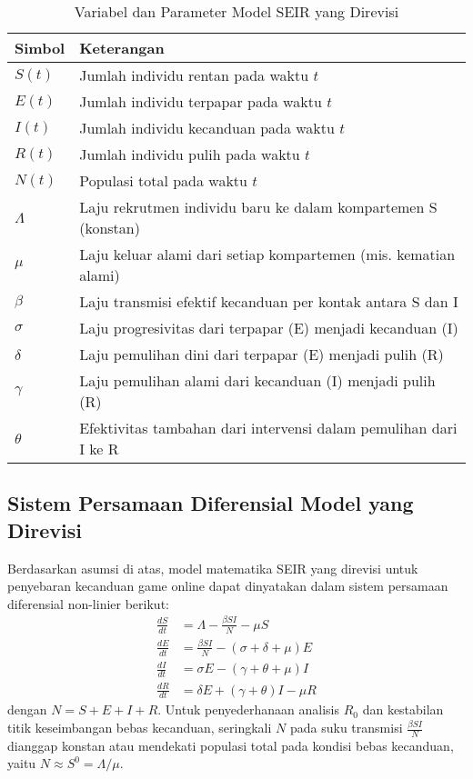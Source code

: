 \documentclass[12pt,a4paper]{article}
\begin{document}
\begin{table}[h!]
\centering
\caption{Variabel dan Parameter Model SEIR yang Direvisi}
\begin{tabular}{ll}
\hline
Simbol & Keterangan \\
\hline
$S(t)$ & Jumlah individu rentan pada waktu $t$ \\
$E(t)$ & Jumlah individu terpapar pada waktu $t$ \\
$I(t)$ & Jumlah individu kecanduan pada waktu $t$ \\
$R(t)$ & Jumlah individu pulih pada waktu $t$ \\
$N(t)$ & Populasi total pada waktu $t$ \\
$\Lambda$ & Laju rekrutmen individu baru ke dalam kompartemen S (konstan) \\
$\mu$ & Laju keluar alami dari setiap kompartemen (mis. kematian alami) \\
$\beta$ & Laju transmisi efektif kecanduan per kontak antara S dan I \\
$\sigma$ & Laju progresivitas dari terpapar (E) menjadi kecanduan (I) \\
$\delta$ & Laju pemulihan dini dari terpapar (E) menjadi pulih (R) \\
$\gamma$ & Laju pemulihan alami dari kecanduan (I) menjadi pulih (R) \\
$\theta$ & Efektivitas tambahan dari intervensi dalam pemulihan dari I ke R \\
\hline
\end{tabular}
\end{table}

\subsection{Sistem Persamaan Diferensial Model yang Direvisi}
Berdasarkan asumsi di atas, model matematika SEIR yang direvisi untuk penyebaran kecanduan game online dapat dinyatakan dalam sistem persamaan diferensial non-linier berikut:
\begin{align}
\frac{dS}{dt} &= \Lambda - \frac{\beta S I}{N} - \mu S \label{eq:S}\\
\frac{dE}{dt} &= \frac{\beta S I}{N} - (\sigma + \delta + \mu)E \label{eq:E}\\
\frac{dI}{dt} &= \sigma E - (\gamma + \theta + \mu)I \label{eq:I}\\
\frac{dR}{dt} &= \delta E + (\gamma + \theta)I - \mu R \label{eq:R}
\end{align}
dengan $N = S+E+I+R$. Untuk penyederhanaan analisis $R_0$ dan kestabilan titik keseimbangan bebas kecanduan, seringkali $N$ pada suku transmisi $\frac{\beta SI}{N}$ dianggap konstan atau mendekati populasi total pada kondisi bebas kecanduan, yaitu $N \approx S^0 = \Lambda/\mu$.
\end{document}
